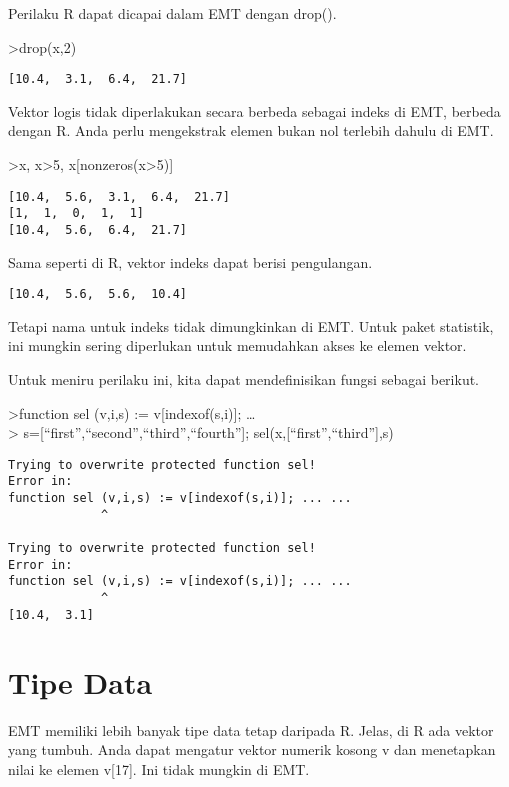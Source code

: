 \documentclass[
]{book}
\begin{document}
Perilaku R dapat dicapai dalam EMT dengan drop().

\textgreater drop(x,2)

\begin{verbatim}
[10.4,  3.1,  6.4,  21.7]
\end{verbatim}

Vektor logis tidak diperlakukan secara berbeda sebagai indeks di EMT, berbeda dengan R. Anda perlu mengekstrak elemen bukan nol terlebih dahulu di EMT.

\textgreater x, x\textgreater5, x{[}nonzeros(x\textgreater5){]}

\begin{verbatim}
[10.4,  5.6,  3.1,  6.4,  21.7]
[1,  1,  0,  1,  1]
[10.4,  5.6,  6.4,  21.7]
\end{verbatim}

Sama seperti di R, vektor indeks dapat berisi pengulangan.

\begin{verbatim}
[10.4,  5.6,  5.6,  10.4]
\end{verbatim}

Tetapi nama untuk indeks tidak dimungkinkan di EMT. Untuk paket statistik, ini mungkin sering diperlukan untuk memudahkan akses ke elemen vektor.

Untuk meniru perilaku ini, kita dapat mendefinisikan fungsi sebagai berikut.

\textgreater function sel (v,i,s) := v{[}indexof(s,i){]}; \ldots{}\\
\textgreater{} s={[}``first'',``second'',``third'',``fourth''{]}; sel(x,{[}``first'',``third''{]},s)

\begin{verbatim}
Trying to overwrite protected function sel!
Error in:
function sel (v,i,s) := v[indexof(s,i)]; ... ...
             ^

Trying to overwrite protected function sel!
Error in:
function sel (v,i,s) := v[indexof(s,i)]; ... ...
             ^
[10.4,  3.1]
\end{verbatim}

\chapter{Tipe Data}\label{tipe-data}

EMT memiliki lebih banyak tipe data tetap daripada R. Jelas, di R ada vektor yang tumbuh. Anda dapat mengatur vektor numerik kosong v dan menetapkan nilai ke elemen v{[}17{]}. Ini tidak mungkin di EMT.
\end{document}
